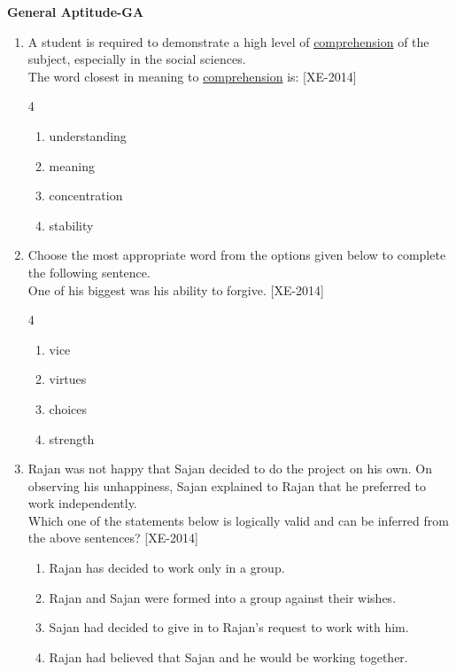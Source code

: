 \documentclass[journal]{IEEEtran}
\begin{document}
\textbf{General Aptitude-GA}\\
\begin{enumerate}

    \item A student is required to demonstrate a high level of \underline{comprehension} of the subject, especially in the social sciences.\\ 
    
	    The word closest in meaning to \underline{comprehension} is: \hfill{[XE-2014]}
    \begin{multicols}{4}
    \begin{enumerate}
        \item understanding
        \item meaning
        \item concentration
        \item stability
    \end{enumerate}
    \end{multicols}

    \item Choose the most appropriate word from the options given below to complete the following sentence.\\ 

	    One of his biggest \underline{\hspace{2cm}} was his ability to forgive. \hfill{[XE-2014]}
    \begin{multicols}{4}
        
    
    \begin{enumerate}
        \item vice
        \item virtues
        \item choices
        \item strength
    \end{enumerate}
    \end{multicols}

    \item Rajan was not happy that Sajan decided to do the project on his own. On observing his unhappiness, Sajan explained to Rajan that he preferred to work independently. \\

	    Which one of the statements below is logically valid and can be inferred from the above sentences? \hfill{[XE-2014]}
    \begin{enumerate}
        \item Rajan has decided to work only in a group.
        \item Rajan and Sajan were formed into a group against their wishes.
        \item Sajan had decided to give in to Rajan’s request to work with him.
        \item Rajan had believed that Sajan and he would be working together.
    \end{enumerate}


\end{enumerate}
\end{document}
